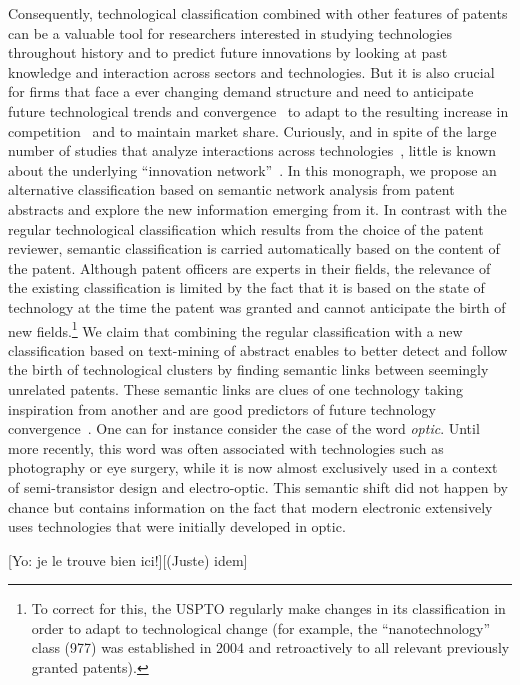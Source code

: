 \documentclass[10pt,A4]{article}
\begin{document}
Consequently, technological classification combined with other features of patents can be a valuable tool for researchers interested in studying technologies throughout history and to predict future innovations by looking at past knowledge and interaction across sectors and technologies. But it is also crucial for firms that face a ever changing demand structure and need to anticipate future technological trends and convergence~\cite{curran2011patent} to adapt to the resulting increase in competition~\cite{Katz1996remarks} and to maintain market share. Curiously, and in spite of the large number of studies that analyze interactions across technologies~\cite{Furman2011shoulders}, little is known about the underlying ``innovation network''~\cite{AAKnetwork2016}. In this monograph, we propose an alternative classification based on semantic network analysis from patent abstracts and explore the new information emerging from it. In contrast with the regular technological classification which results from the choice of the patent reviewer, semantic classification is carried automatically based on the content of the patent. Although patent officers are experts in their fields, the relevance of the existing classification is limited by the fact that it is based on the state of technology at the time the patent was granted and cannot anticipate the birth of new fields.\footnote{To correct for this, the USPTO regularly make changes in its classification in order to adapt to technological change (for example, the ``nanotechnology'' class (977) was established in 2004 and  retroactively to all relevant previously granted patents).} We claim that combining the regular classification with a new classification based on text-mining of abstract enables to better detect and follow the birth of technological clusters by finding semantic links between seemingly unrelated patents. These semantic links are clues of one technology taking inspiration from another and are good predictors of future technology convergence~\cite{preschitschek2013}. One can for instance consider the case of the word \textit{optic}. Until more recently, this word was often associated with technologies such as photography or eye surgery, while it is now almost exclusively used in a context of semi-transistor design and electro-optic. This semantic shift did not happen by chance but contains information on the fact that modern electronic extensively uses technologies that were initially developed in optic. 

[Yo: je le trouve bien ici!][(Juste) idem]
\end{document}
